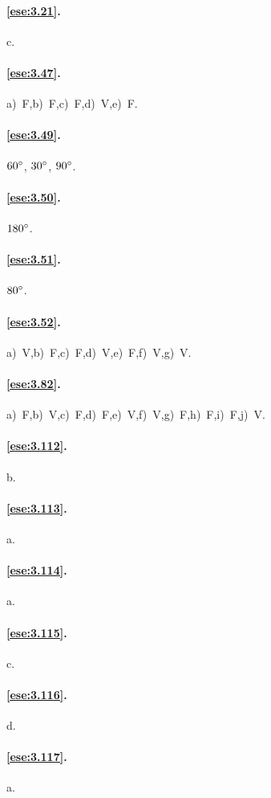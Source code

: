 \paragraph{\ref{ese:3.21}.}
c.

\paragraph{\ref{ese:3.47}.}
a)~F,\quad b)~F,\quad c)~F,\quad d)~V,\quad e)~F.

\paragraph{\ref{ese:3.49}.}
$60{}^{\circ}$, $30{}^{\circ}$, $90{}^{\circ}$.

\paragraph{\ref{ese:3.50}.}
$180{}^{\circ}$.

\paragraph{\ref{ese:3.51}.}
$80{}^{\circ}$.

\paragraph{\ref{ese:3.52}.}
a)~V,\quad b)~F,\quad c)~F,\quad d)~V,\quad e)~F,\quad f)~V,\quad g)~V.

\paragraph{\ref{ese:3.82}.}
a)~F,\quad b)~V,\quad c)~F,\quad d)~F,\quad e)~V,\quad f)~V,\quad g)~F,\quad h)~F,\quad i)~F,\quad j)~V.

\paragraph{\ref{ese:3.112}.}
b.

\paragraph{\ref{ese:3.113}.}
a.

\paragraph{\ref{ese:3.114}.}
a.

\paragraph{\ref{ese:3.115}.}
c.

\paragraph{\ref{ese:3.116}.}
d.

\paragraph{\ref{ese:3.117}.}
a.

\endgroup
